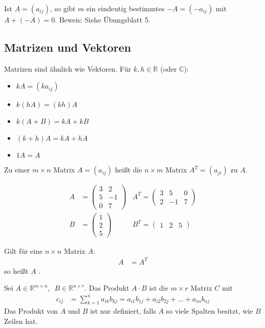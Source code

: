 Ist $A = (a_{ij})$, so gibt es ein eindeutig bestimmtes $-A = (-a_{ij})$ mit $A + (-A) = 0$. Beweis: Siehe Übungsblatt 5.

\subsection{Matrizen und Vektoren}
Matrizen sind ähnlich wie Vektoren. Für $k, h \in \mathbb{R}$ (oder $\mathbb{C}$):
\begin{itemize}
    \item{$kA = (k a_{ij})$}
    \item{$k(hA) = (kh)A$}
    \item{$k(A+B) = kA + kB$}
    \item{$(k+h)A = kA + hA$}
    \item{$1A = A$}
\end{itemize}

Zu einer $m \times n$ Matrix $A = (a_{ij})$ heißt die $n \times m$ Matrix $A^T = (a_{ji})$  zu $A$.

\begin{align*}
    A &= \begin{pmatrix}
        3 & 2 \\
        5 & -1 \\
        0 & 7
    \end{pmatrix} & A^T = \begin{pmatrix}
        3 & 5 & 0 \\
        2 & -1 & 7
    \end{pmatrix} \\
    B &= \begin{pmatrix}
        1 \\
        2 \\
        5
    \end{pmatrix} & B^T = \begin{pmatrix}
        1 & 2 & 5
    \end{pmatrix}
\end{align*}

Gilt für eine $n \times n$ Matrix $A$:
\begin{align*}
    A &= A^T
\end{align*}
so heißt $A$ .

Sei $A \in \mathbb{R}^{m \times n},\enspace B \in \mathbb{R}^{n \times r}$. Das Produkt $A \cdot B$ ist die $m \times r$ Matrix $C$ mit
\begin{align*}
    c_{ij} &= \sum_{k=1}^{n} a_{ik} b_{kj} = a_{i1} b_{1j} + a_{i2} b_{2j} + \dots + a_{in} b_{nj}
\end{align*}
Das Produkt von $A$ und $B$ ist nur definiert, falls $A$ so viele Spalten besitzt, wie $B$ Zeilen hat.

